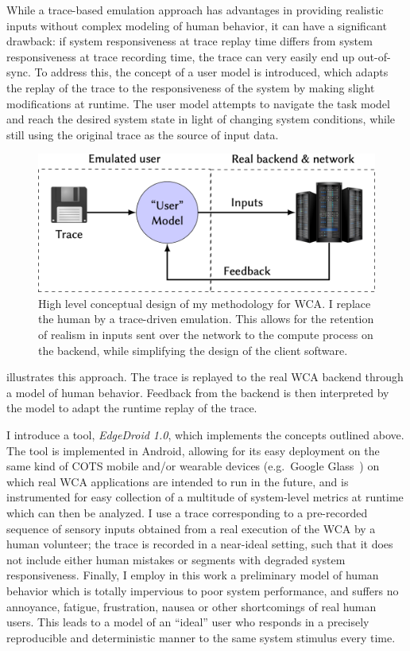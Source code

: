 While a trace-based emulation approach has advantages in providing realistic inputs without complex modeling of human behavior, it can have a significant drawback:
if system responsiveness at trace replay time differs from system responsiveness at trace recording time, the trace can very easily end up out-of-sync.
To address this, the concept of a user model is introduced, which adapts the replay of the trace to the responsiveness of the system by making slight modifications at runtime.
The user model attempts to navigate the task model and reach the desired system state in light of changing system conditions, while still using the original trace as the source of input data.

\begin{figure}
    \centering
    \includegraphics[width=.9\textwidth]{Figs/trace_edgedroid}
    \caption{%
        High level conceptual design of my methodology for \gls{WCA}.
        I replace the human by a trace-driven emulation.
        This allows for the retention of realism in inputs sent over the network to the compute process on the backend, while simplifying the design of the client software.
    }\label{fig:methodology:wca:conceptual}
\end{figure}

 illustrates this approach.
The trace is replayed to the real \gls{WCA} backend through a model of human behavior.
Feedback from the backend is then interpreted by the model to adapt the runtime replay of the trace.

I introduce a tool, \emph{EdgeDroid \num{1.0}}, which implements the concepts outlined above.
The tool is implemented in Android, allowing for its easy deployment on the same kind of \gls{COTS} mobile and/or wearable devices (e.g.\ Google Glass~\cite{googleglass}) on which real \gls{WCA} applications are intended to run in the future, and is instrumented for easy collection of a multitude of system-level metrics at runtime which can then be analyzed.
I use a trace corresponding to a pre-recorded sequence of sensory inputs obtained from a real execution of the \gls{WCA} by a human volunteer;
the trace is recorded in a near-ideal setting, such that it does not include either human mistakes or segments with degraded system responsiveness.
Finally, I employ in this work a preliminary model of human behavior which is totally impervious to poor system performance, and suffers no annoyance, fatigue, frustration, nausea or other shortcomings of real human users.
This leads to a model of an ``ideal'' user who responds in a precisely reproducible and deterministic manner to the same system stimulus every time.

